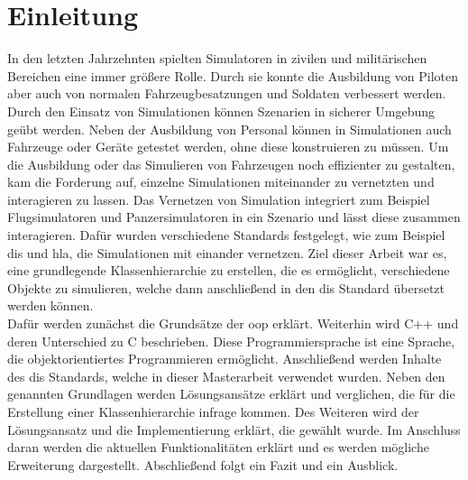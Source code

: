 \chapter{Einleitung}\label{Einleitung}
\onehalfspacing
In den letzten Jahrzehnten spielten Simulatoren in zivilen und militärischen Bereichen eine immer größere Rolle. Durch sie konnte die Ausbildung von Piloten aber auch von normalen Fahrzeugbesatzungen und Soldaten verbessert werden. Durch den Einsatz von Simulationen können Szenarien in sicherer Umgebung geübt werden. Neben der Ausbildung von Personal können in Simulationen auch Fahrzeuge oder Geräte getestet werden, ohne diese konstruieren zu müssen. 
Um die Ausbildung oder das Simulieren von Fahrzeugen noch effizienter zu gestalten, kam die Forderung auf, einzelne Simulationen miteinander zu vernetzten und interagieren zu lassen. Das Vernetzen von Simulation integriert zum Beispiel Flugsimulatoren und Panzersimulatoren in ein Szenario und lässt diese zusammen interagieren. 
Dafür wurden verschiedene Standards festgelegt, wie zum Beispiel \ac{dis} und \ac{hla}, die Simulationen mit einander vernetzen. Ziel dieser Arbeit war es, eine grundlegende Klassenhierarchie zu erstellen, die es ermöglicht, verschiedene Objekte zu simulieren, welche dann anschließend in den \ac{dis} Standard übersetzt werden können.  \\
Dafür werden zunächst die Grundsätze der \ac{oop} erklärt. Weiterhin wird C++ und deren Unterschied zu C beschrieben. Diese Programmiersprache ist eine Sprache, die objektorientiertes Programmieren ermöglicht. Anschließend werden  Inhalte des \ac{dis} Standards, welche in dieser Masterarbeit verwendet wurden. Neben den genannten Grundlagen werden Lösungsansätze erklärt und verglichen, die für die Erstellung einer Klassenhierarchie infrage kommen. Des Weiteren wird der Lösungsansatz und die Implementierung  erklärt, die gewählt wurde. Im Anschluss daran werden die aktuellen Funktionalitäten erklärt und es werden mögliche Erweiterung dargestellt. Abschließend folgt ein Fazit und ein Ausblick.  
       